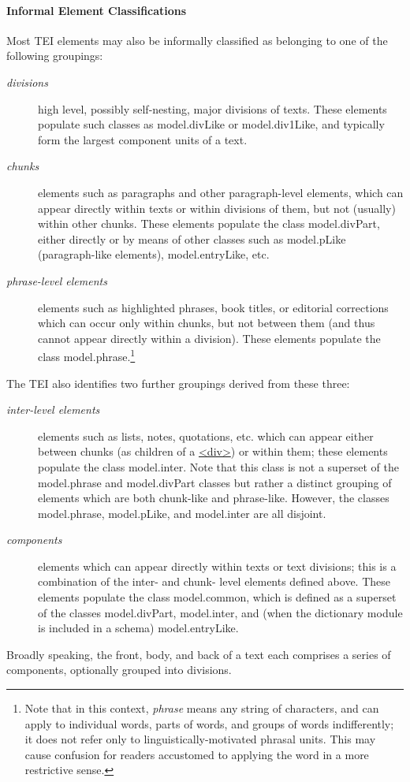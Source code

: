 \paragraph[{Informal Element Classifications }]{Informal Element Classifications }\label{STBTC}\par
Most TEI elements may also be informally classified as belonging to one of the following groupings: \begin{description}

\item[{\textit{divisions}}]high level, possibly self-nesting, major divisions of texts. These elements populate such classes as \textsf{model.divLike} or \textsf{model.div1Like}, and typically form the largest component units of a text.
\item[{\textit{chunks}}]elements such as paragraphs and other paragraph-level elements, which can appear directly within texts or within divisions of them, but not (usually) within other chunks. These elements populate the class \textsf{model.divPart}, either directly or by means of other classes such as \textsf{model.pLike} (paragraph-like elements), \textsf{model.entryLike}, etc.
\item[{\textit{phrase-level elements}}]elements such as highlighted phrases, book titles, or editorial corrections which can occur only within chunks, but not between them (and thus cannot appear directly within a division). These elements populate the class \textsf{model.phrase}.\footnote{Note that in this context, \textit{phrase} means any string of characters, and can apply to individual words, parts of words, and groups of words indifferently; it does not refer only to linguistically-motivated phrasal units. This may cause confusion for readers accustomed to applying the word in a more restrictive sense.}
\end{description} \par
The TEI also identifies two further groupings derived from these three: \begin{description}

\item[{\textit{inter-level elements}}]elements such as lists, notes, quotations, etc. which can appear either between chunks (as children of a \hyperref[TEI.div]{<div>}) or within them; these elements populate the class \textsf{model.inter}. Note that this class is not a superset of the \textsf{model.phrase} and \textsf{model.divPart} classes but rather a distinct grouping of elements which are both chunk-like and phrase-like. However, the classes \textsf{model.phrase}, \textsf{model.pLike}, and \textsf{model.inter} are all disjoint.
\item[{\textit{components}}]elements which can appear directly within texts or text divisions; this is a combination of the inter- and chunk- level elements defined above. These elements populate the class \textsf{model.common}, which is defined as a superset of the classes \textsf{model.divPart}, \textsf{model.inter}, and (when the dictionary module is included in a schema) \textsf{model.entryLike}.
\end{description}  Broadly speaking, the front, body, and back of a text each comprises a series of components, optionally grouped into divisions.\par
